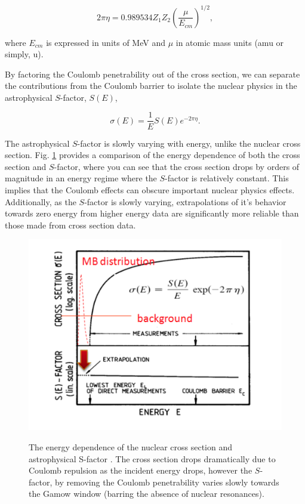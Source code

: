 \begin{equation}
2\pi \eta = 0.989534 Z_{1} Z_{2} \left( \dfrac{\mu}{E_{cm}} \right)^{1/2}, 
\label{eqn: gamow factor}
\end{equation}

\noindent where $E_{cm}$ is expressed in units of MeV and $\mu$ in atomic mass units (amu or simply, u). 

By factoring the Coulomb penetrability out of the cross section, we can separate the contributions from the Coulomb barrier to isolate the nuclear physics in the astrophysical $S$-factor, $S(E)$, 

\begin{equation}
\sigma(E) = \dfrac{1}{E} S(E) e^{-2\pi \eta}.
\label{eqn: s-factor definition}
\end{equation}

\noindent The astrophysical $S$-factor is slowly varying with energy, unlike the nuclear cross section. Fig. \ref{fig: energy dependence} provides a comparison of the energy dependence of both the cross section and $S$-factor, where you can see that the cross section drops by orders of magnitude in an energy regime where the $S$-factor is relatively constant. This implies that the Coulomb effects can obscure important nuclear physics effects. Additionally, as the $S$-factor is slowly varying, extrapolations of it's behavior towards zero energy from higher energy data are significantly more reliable than those made from cross section data. 

\begin{figure}
\includegraphics[width=\linewidth]{figures/crossSectionDependence.png}
\label{fig: energy dependence}
\caption{The energy dependence of the nuclear cross section and astrophysical S-factor \cite{RolfsBook}. The cross section drops dramatically due to Coulomb repulsion as the incident energy drops, however the $S$-factor, by removing the Coulomb penetrability varies slowly towards the Gamow window (barring the absence of nuclear resonances). }
\end{figure}

